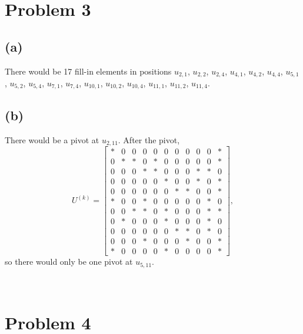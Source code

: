 \documentclass[11pt]{article}
\theoremstyle{definition}
\theoremstyle{remark}
\newcommand{\newquestion}{\hrulefill\vspace{-0.8\baselineskip}\\\null\hrulefill\vspace{-1.0\baselineskip}}
\newcommand{\newpart}{\vspace{-0.5\baselineskip}\hrulefill\vspace{-1.3\baselineskip}}
\theoremstyle{plain}
\begin{document}
\section*{Problem 3}

\newpart
\subsection*{(a)}
There would be 17 fill-in elements in positions $u_{2,1}$, $u_{2,2}$, $u_{2,4}$, $u_{4,1}$, $u_{4,2}$, $u_{4,4}$, $u_{5,1}$, $u_{5,2}$, $u_{5,4}$, $u_{7,1}$, $u_{7,4}$, $u_{10,1}$, $u_{10,2}$, $u_{10,4}$, $u_{11,1}$, $u_{11,2}$, $u_{11,4}$.

\newpart
\subsection*{(b)}
There would be a pivot at $u_{2,11}$. After the pivot,
\begin{equation*}
  U^{(k)}=\left[
    \begin{array}{ccccccccccc}
      *&0&0&0&0&0&0&0&0&0&*\\
      0&*&*&0&*&0&0&0&0&0&*\\
      0&0&0&*&*&0&0&0&*&*&0\\
      0&0&0&0&0&*&0&0&*&0&*\\
      0&0&0&0&0&0&*&*&0&0&*\\
      *&0&0&*&0&0&0&0&0&*&0\\
      0&0&*&*&0&*&0&0&0&*&*\\
      0&*&0&0&0&*&0&0&0&*&0\\
      0&0&0&0&0&0&*&*&0&*&0\\
      0&0&0&*&0&0&0&*&0&0&*\\
      *&0&0&0&0&*&0&0&0&0&*
    \end{array}\right],
\end{equation*}
so there would only be one pivot at $u_{5,11}$.

\newquestion
%
%
\section*{Problem 4}

\newpart
\end{document}
